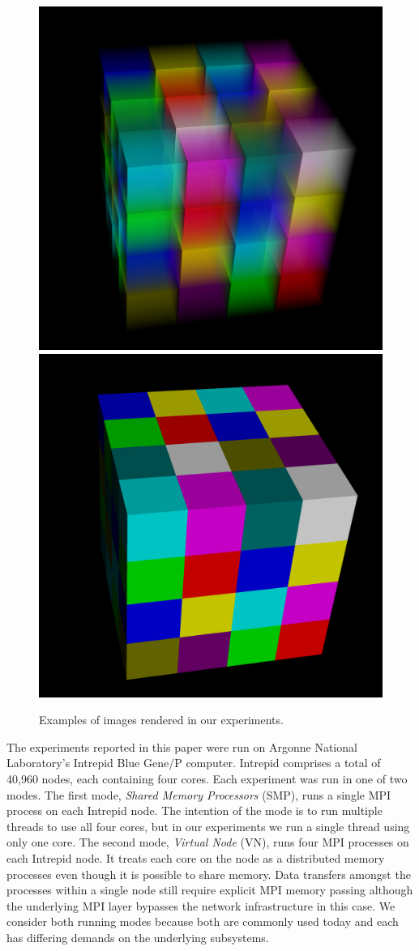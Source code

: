\documentclass{vgtc}                          %
\newcommand*{\keyterm}[1]{\emph{#1}}
\begin{document}
\begin{figure}[htb]
  \centering
  \includegraphics[width=.4\linewidth]{images/TransparentOutput}
  \quad
  \includegraphics[width=.4\linewidth]{images/OpaqueOutput}
  \caption{Examples of images rendered in our experiments.}
  \label{fig:SimpleTimingOutput}
\end{figure}

The experiments reported in this paper were run on Argonne National
Laboratory's Intrepid Blue Gene/P computer.  Intrepid comprises a total of
40,960 nodes, each containing four cores.  Each experiment was run in one
of two modes.  The first mode, \keyterm{Shared Memory Processors} (SMP),
runs a single MPI process on each Intrepid node.  The intention of the mode
is to run multiple threads to use all four cores, but in our experiments we
run a single thread using only one core.  The second mode, \keyterm{Virtual
  Node} (VN), runs four MPI processes on each Intrepid node.  It treats
each core on the node as a distributed memory processes even though it is
possible to share memory.  Data transfers amongst the processes within a
single node still require explicit MPI memory passing although the
underlying MPI layer bypasses the network infrastructure in this case.  We
consider both running modes because both are commonly used today and each
has differing demands on the underlying subsystems.




\end{document}
